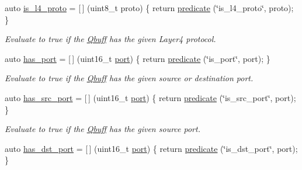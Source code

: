 \begin{DoxyCompactItemize}
auto \hyperlink{namespacepfq_1_1lang_1_1anonymous__namespace_02default_8hpp_03_a9d06d4dedca1ebdc3b270cb2f3e9e42b}{is\+\_\+l4\+\_\+proto} = \mbox{[}$\,$\mbox{]} (uint8\+\_\+t proto) \{ return \hyperlink{namespacepfq_1_1lang_aca9adafc436b7f851621b979fa1aaf88}{predicate} (\char`\"{}is\+\_\+l4\+\_\+proto\char`\"{}, proto); \}
\begin{DoxyCompactList}\small\item\em Evaluate to {\ttfamily true} if the \hyperlink{structpfq_1_1lang_1_1Qbuff}{Qbuff} has the given Layer4 protocol. \end{DoxyCompactList}\item 
auto \hyperlink{namespacepfq_1_1lang_1_1anonymous__namespace_02default_8hpp_03_a9f7161b8dfb842c5a845f413eb6bc82f}{has\+\_\+port} = \mbox{[}$\,$\mbox{]} (uint16\+\_\+t \hyperlink{namespacepfq_1_1lang_1_1anonymous__namespace_02default_8hpp_03_a868eca03290a037cb4e9b7075085888b}{port}) \{ return \hyperlink{namespacepfq_1_1lang_aca9adafc436b7f851621b979fa1aaf88}{predicate} (\char`\"{}is\+\_\+port\char`\"{}, port); \}
\begin{DoxyCompactList}\small\item\em Evaluate to {\ttfamily true} if the \hyperlink{structpfq_1_1lang_1_1Qbuff}{Qbuff} has the given source or destination port. \end{DoxyCompactList}\item 
auto \hyperlink{namespacepfq_1_1lang_1_1anonymous__namespace_02default_8hpp_03_a964d5ed41f50a1f3a04176f8e54d7a5a}{has\+\_\+src\+\_\+port} = \mbox{[}$\,$\mbox{]} (uint16\+\_\+t \hyperlink{namespacepfq_1_1lang_1_1anonymous__namespace_02default_8hpp_03_a868eca03290a037cb4e9b7075085888b}{port}) \{ return \hyperlink{namespacepfq_1_1lang_aca9adafc436b7f851621b979fa1aaf88}{predicate} (\char`\"{}is\+\_\+src\+\_\+port\char`\"{}, port); \}
\begin{DoxyCompactList}\small\item\em Evaluate to {\ttfamily true} if the \hyperlink{structpfq_1_1lang_1_1Qbuff}{Qbuff} has the given source port. \end{DoxyCompactList}\item 
auto \hyperlink{namespacepfq_1_1lang_1_1anonymous__namespace_02default_8hpp_03_afa71ece0f4178d0200c0388f503eef14}{has\+\_\+dst\+\_\+port} = \mbox{[}$\,$\mbox{]} (uint16\+\_\+t \hyperlink{namespacepfq_1_1lang_1_1anonymous__namespace_02default_8hpp_03_a868eca03290a037cb4e9b7075085888b}{port}) \{ return \hyperlink{namespacepfq_1_1lang_aca9adafc436b7f851621b979fa1aaf88}{predicate} (\char`\"{}is\+\_\+dst\+\_\+port\char`\"{}, port); \}

\end{DoxyCompactItemize}
